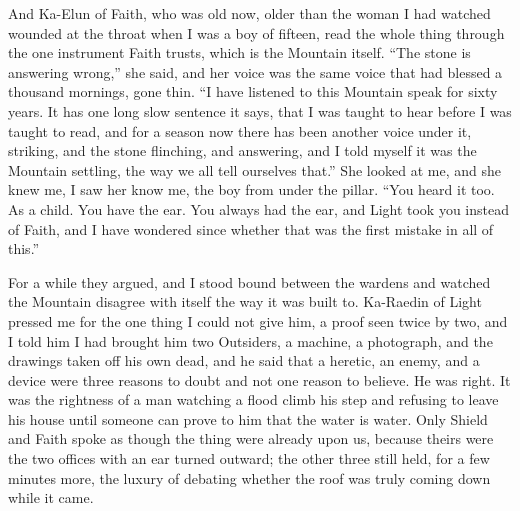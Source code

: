 And Ka-Elun of Faith, who was old now, older than the woman I had watched wounded at the throat when I was a boy of fifteen, read the whole thing through the one instrument Faith trusts, which is the Mountain itself. ``The stone is answering wrong,'' she said, and her voice was the same voice that had blessed a thousand mornings, gone thin. ``I have listened to this Mountain speak for sixty years. It has one long slow sentence it says, that I was taught to hear before I was taught to read, and for a season now there has been another voice under it, striking, and the stone flinching, and answering, and I told myself it was the Mountain settling, the way we all tell ourselves that.'' She looked at me, and she knew me, I saw her know me, the boy from under the pillar. ``You heard it too. As a child. You have the ear. You always had the ear, and Light took you instead of Faith, and I have wondered since whether that was the first mistake in all of this.''\par

For a while they argued, and I stood bound between the wardens and watched the Mountain disagree with itself the way it was built to. Ka-Raedin of Light pressed me for the one thing I could not give him, a proof seen twice by two, and I told him I had brought him two Outsiders, a machine, a photograph, and the drawings taken off his own dead, and he said that a heretic, an enemy, and a device were three reasons to doubt and not one reason to believe. He was right. It was the rightness of a man watching a flood climb his step and refusing to leave his house until someone can prove to him that the water is water. Only Shield and Faith spoke as though the thing were already upon us, because theirs were the two offices with an ear turned outward; the other three still held, for a few minutes more, the luxury of debating whether the roof was truly coming down while it came.\par

